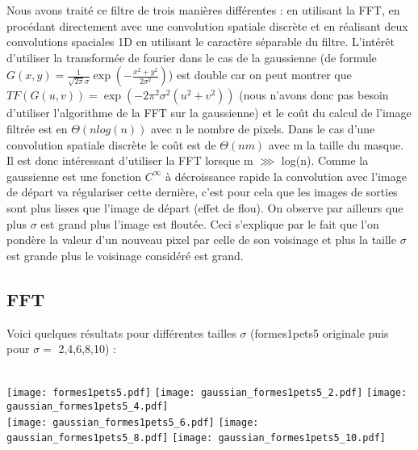 \documentclass[12pt]{article}
\numberwithin{equation}{section}
\begin{document}
Nous avons traité ce filtre de trois manières différentes : en utilisant la FFT, en procédant directement avec une convolution spatiale discrète et en réalisant deux convolutions spaciales 1D en utilisant le caractère séparable du filtre. L'intérêt d'utiliser la transformée de fourier dans le cas de la gaussienne (de formule $G(x,y) = \frac{1}{\sqrt{2\pi }\sigma}\exp({-\frac{x^2 + y^2}{2\sigma^2}})$) est double car on peut montrer que $TF(G(u,v)) = \exp({-2\pi^2 \sigma^2(u^2 + v^2)})$ (nous n'avons donc pas besoin d'utiliser l'algorithme de la FFT sur la gaussienne) et le coût du calcul de l'image filtrée est en $\Theta(nlog(n))$ avec n le nombre de pixels. Dans le cas d'une convolution spatiale discrète le coût est de $\Theta(nm)$ avec m la taille du masque. Il est donc intéressant d'utiliser la FFT lorsque m $\ggg $ log(n). 
Comme la gaussienne est une fonction $C^\infty$ à décroissance rapide la convolution avec l'image de départ va régulariser cette dernière, c'est pour cela que les images de sorties sont plus lisses que l'image de départ (effet de flou). On observe par ailleurs que plus $\sigma$ est grand plus l'image est floutée. Ceci s'explique par le fait que l'on pondère la valeur d'un nouveau pixel par celle de son voisinage et plus la taille $\sigma$ est grande plus le voisinage considéré est grand.

\subsection{FFT}
Voici quelques résultats pour différentes tailles $\sigma$ (formes1pets5 originale puis pour $\sigma =$ 2,4,6,8,10) : \\\\
\begin{center}
\texttt{[image: formes1pets5.pdf]}
\texttt{[image: gaussian\_formes1pets5\_2.pdf]}
\texttt{[image: gaussian\_formes1pets5\_4.pdf]}\\
\texttt{[image: gaussian\_formes1pets5\_6.pdf]}
\texttt{[image: gaussian\_formes1pets5\_8.pdf]}
\texttt{[image: gaussian\_formes1pets5\_10.pdf]}
\end{center}
\end{document}
